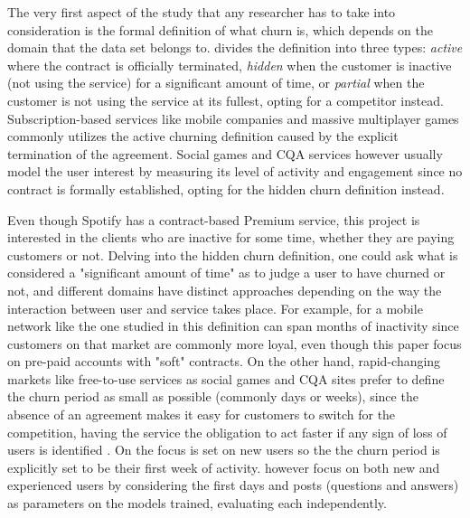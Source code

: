 \documentclass{kththesis}
\begin{document}
The very first aspect of the study that any researcher has to take into consideration is the formal definition of what churn is, which depends on the domain that the data set belongs to. \citep{lazarov2007churn} divides the definition into three types: \emph{active} where the contract is officially terminated, \emph{hidden} when the customer is inactive (not using the service) for a significant amount of time, or \emph{partial} when the customer is not using the service at its fullest, opting for a competitor instead. Subscription-based services like mobile companies \citep{Lu2014}\citep{Hassouna2015} and massive multiplayer games \citep{Borbora2011} commonly utilizes the active churning definition caused by the explicit termination of the agreement. Social games \citep{Runge2014}\citep{Drachen2016RapidPO} and CQA services \citep{Pudipeddi2014}\citep{Dror2012} however usually model the user interest by measuring its level of activity and engagement since no contract is formally established, opting for the hidden churn definition instead. 

Even though Spotify has a contract-based Premium service, this project is interested in the clients who are inactive for some time, whether they are paying customers or not. Delving into the hidden churn definition, one could ask what is considered a "significant amount of time" as to judge a user to have churned or not, and different domains have distinct approaches depending on the way the interaction between user and service takes place. For example, for a mobile network like the one studied in \citep{Khan2015} this definition can span months of inactivity since customers on that market are commonly more loyal, even though this paper focus on pre-paid accounts with "soft" contracts. On the other hand, rapid-changing markets like free-to-use services as social games and CQA sites prefer to define the churn period as small as possible (commonly days or weeks), since the absence of an agreement makes it easy for customers to switch for the competition, having the service the obligation to act faster if any sign of loss of users is identified \citep{Khan2015}\citep{Drachen2016RapidPO}. On \citep{Dror2012} the focus is set on new users so the the churn period is explicitly set to be their first week of activity. \citep{Pudipeddi2014} however focus on both new and experienced users by considering the first days and posts (questions and answers) as parameters on the models trained, evaluating each independently.
\end{document}
